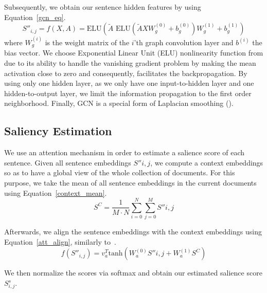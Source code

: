 \documentclass{article}
\begin{document}
Subsequently, we obtain our sentence hidden features by using Equation~\ref{gcn_eq}.
\begin{equation}
\label{gcn_eq}
S''_{i,j} = f(X, A) = \textrm{ELU}(\tilde{A}\textrm{ ELU}(\tilde{A}XW_g^{(0)} + b_g^{(0)})W_g^{(1)} + b_g^{(1)})	
\end{equation}
 where $W_g^{(i)}$ is the weight matrix of the $i$'th graph convolution layer and $b^{(i)}$ the bias vector. 
We choose Exponential Linear Unit (ELU) nonlinearity function from \citet{KlambauerUMH17} due to its ability to handle the vanishing gradient problem by making the mean activation close to zero and consequently, facilitates the backpropagation. By using only one hidden layer, as we only have one input-to-hidden layer and one hidden-to-output layer, we limit the information propagation to the first order neighborhood. Finally, GCN is a special form of Laplacian smoothing (\citet{li2018deeper}).

\subsection{Saliency Estimation}

We use an attention mechanism in order to estimate a salience score of each sentence. Given all sentence embeddings $S''{i,j}$, we compute a context embeddings so as to have a global view of the whole collection of documents. For this purpose, we take the mean of all sentence embeddings in the current documents using Equation~\ref{context_mean}.
\begin{equation}
\label{context_mean}
	S^C = \frac{1}{M \cdot N}\sum_{i=0}^N\sum_{j=0}^M S''{i,j}
\end{equation}

Afterwards, we align the sentence embeddings with the context embeddings using Equation~\ref{att_align}, similarly to~\citet{BahdanauCB14, vinyals2015pointer, Yasunaga17}. 
\begin{equation}
\label{att_align}
	f(S''_{i,j}) = v_a^T\textrm{tanh}(W_a^{(0)}S''{i,j} + W_a^{(1)}S^C)
\end{equation}

We then normalize the scores via softmax and obtain our estimated salience score $S^s_{i,j}$.%

\end{document}
